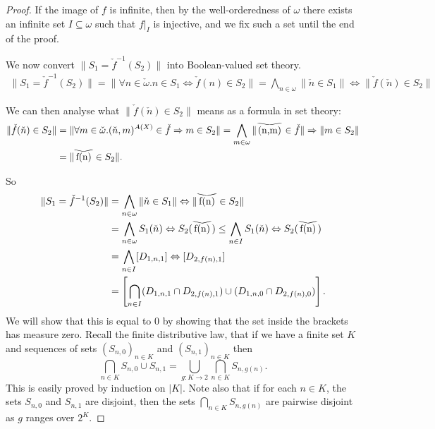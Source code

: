 \documentclass{lmcs}
\newcommand{\verywidecheck}[1]{
	\savestack{\tmpbox}{\stretchto{
			\scaleto{
				\scalerel*[\widthof{\ensuremath{#1}}]{\kern-.6pt\bigvee\kern-.6pt}
				{\rule[-\textheight/2]{1ex}{\textheight}}
			}{\textheight}
		}{0.5ex}}
	\stackon[1pt]{#1}{\tmpbox}
}
\begin{document}
\begin{proof}
If the image of $f$ is infinite, then by the well-orderedness of $\omega$ there exists an infinite set $I \subseteq \omega$ such that $f|_I$ is injective, and we fix such a set until the end of the proof. 
	
We now convert $\| S_1 = \check{f}^{-1}(S_2) \|$ into Boolean-valued set theory.
\begin{align*}
\| S_1 = \check{f}^{-1}(S_2) \| = \| \forall n \in \check{\omega} . n \in S_1 \Leftrightarrow \check{f}(n) \in S_2 \| = \bigwedge_{n \in \omega} \| \check{n} \in S_1 \| \Leftrightarrow \| \check{f}(\check{n}) \in S_2 \| 
\end{align*}
	
We can then analyse what $\| \check{f}(\check{n}) \in S_2 \|$ means as a formula in set theory:
\begin{align*}
\| \check{f}(\check{n}) \in S_2 \| &= \| \forall m \in \check{\omega}. (\check{n},m)^{A(X)} \in \check{f} \Rightarrow m \in S_2 \| = \bigwedge_{m \in \omega} \| \verywidecheck{(n,m)} \in \check{f} \| \Rightarrow \| m \in S_2 \| \\
&= \| \verywidecheck{f(n)} \in S_2 \|.
\end{align*}
	
So
\begin{align*}
\| S_1 = \check{f}^{-1}(S_2) \| &= \bigwedge_{n \in \omega} \| \check{n} \in S_1 \| \Leftrightarrow \| \verywidecheck{f(n)} \in S_2 \| \\
 &=  \bigwedge_{n \in \omega} S_1(\check{n}) \Leftrightarrow S_2(\verywidecheck{f(n)}) \leq \bigwedge_{n \in I} S_1(\check{n}) \Leftrightarrow S_2(\verywidecheck{f(n)}) \\
&= \bigwedge_{n \in I} [D_{1,n,1}] \Leftrightarrow [D_{2,f(n),1}] \\
 &= \left[ \bigcap_{n \in I} (D_{1,n,1} \cap D_{2,f(n),1}) \cup (D_{1,n,0} \cap D_{2,f(n),0})\right].
\end{align*}
We will show that this is equal to $0$ by showing that the set inside the brackets has measure zero. Recall the finite distributive law, that if we have a finite set $K$ and sequences of sets $(S_{n,0})_{n \in K}$ and $(S_{n,1})_{n \in K}$ then
\[
\bigcap_{n \in K} S_{n,0} \cup S_{n,1} = \bigcup_{g : K \rightarrow 2} \bigcap_{n \in K} S_{n,g(n)}.
\]
This is easily proved by induction on $|K|$. Note also that if for each $n \in K$, the sets $S_{n,0}$ and $S_{n,1}$ are disjoint, then the sets $\bigcap_{n \in K} S_{n,g(n)}$ are pairwise disjoint as $g$ ranges over $2^K$. 
	

\end{proof}
\end{document}
